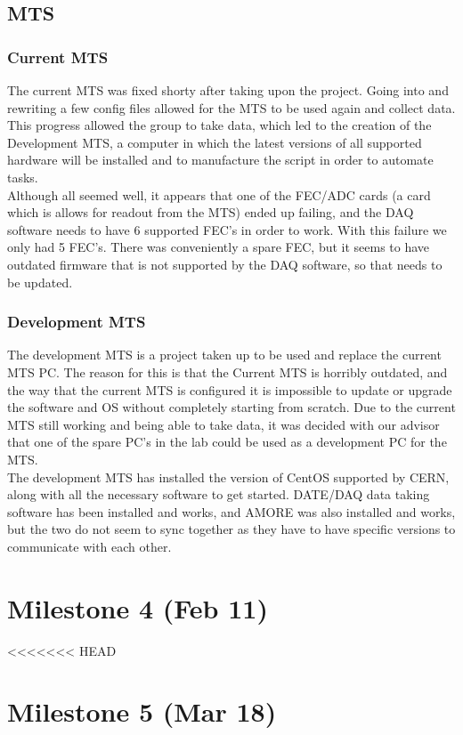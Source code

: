 \documentclass[12pt]{article}
\newcommand\tab[1][1cm]{\hspace*{#1}}
\begin{document}
\subsection{MTS}
\subsubsection{Current MTS}
\tab The current MTS was fixed shorty after taking upon the project. Going into and rewriting a few config files allowed for the MTS to be used again and collect data. This progress allowed the group to take data, which led to the creation of the Development MTS, a computer in which the latest versions of all supported hardware will be installed and to manufacture the script in order to automate tasks. \\
\tab Although all seemed well, it appears that one of the FEC/ADC cards (a card which is allows for readout from the MTS) ended up failing, and the DAQ software needs to have 6 supported FEC's in order to work. With this failure we only had 5 FEC's. There was conveniently a spare FEC, but it seems to have outdated firmware that is not supported by the DAQ software, so that needs to be updated. 
\subsubsection{Development MTS}
\tab The development MTS is a project taken up to be used and replace the current MTS PC. The reason for this is that the Current MTS is horribly outdated, and the way that the current MTS is configured it is impossible to update or upgrade the software and OS without completely starting from scratch. Due to the current MTS still working and being able to take data, it was decided with our advisor that one of the spare PC's in the lab could be used as a development PC for the MTS. \\
\tab The development MTS has installed the version of CentOS supported by CERN, along with all the necessary software to get started. DATE/DAQ data taking software has been installed and works, and AMORE was also installed and works, but the two do not seem to sync together as they have to have specific versions to communicate with each other.


\section{Milestone 4 (Feb 11)}
<<<<<<< HEAD

\section{Milestone 5 (Mar 18)}
\end{document}
